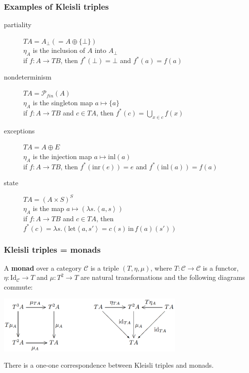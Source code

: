 \documentclass{beamer}
\newcommand{\inl}[1]{\text{inl}(#1)}
\newcommand{\inr}[1]{\text{inr}(#1)}
\begin{document}
\begin{frame}
  \frametitle{Examples of Kleisli triples}

  \begin{description}
  \item[partiality] $T A = A_\bot (= A \oplus \{ \bot \})$ \\
    $\eta_A$ is the inclusion of $A$ into $A_\bot$ \\
    if $f : A \to T B$, then $f^*(\bot) = \bot$ and $f^*(a) = f(a)$
  \vfill
  \pause
  \item[nondeterminism] $T A = \mathcal{P}_{fin}(A)$ \\
    $\eta_A$ is the singleton map $a \mapsto \{a\}$ \\
    if $f: A \to T B$ and $c \in T A$, then $f^*(c) = \bigcup_{x \in c} f(x)$
  \vfill
  \pause
  \item[exceptions] $T A = A \oplus E$ \\
    $\eta_A$ is the injection map $a \mapsto \inl{a}$ \\
    if $f : A \to T B$, then $f^*(\inr{e}) = e$ and $f^*(\inl{a}) = f(a)$
  \vfill
  \pause
  \item[state] $T A = (A \times S)^S$ \\
    $\eta_A$ is the map $a \mapsto (\lambda s. \left< a, s \right>)$ \\
    if $f : A \to T B$ and $c \in T A$, then $f^*(c) = \lambda s. (\text{let} \left<
    a, s' \right> = c(s) \, \text{in} \, f(a)(s'))$
  \end{description}
\end{frame}

\begin{frame}
  \frametitle{Kleisli triples = monads}

  A \textbf{monad} over a category $\mathcal{C}$ is a triple $(T, \eta, \mu)$,
  where $T : \mathcal{C} \to \mathcal{C}$ is a functor, $\eta :
  \text{Id}_{\mathcal{C}} \to T$ and $\mu : T^2 \to T$ are natural
  transformations and the following diagrams commute:

  \begin{center}
  \includegraphics[width=0.7\textwidth]{monad-diagrams.png}
  \end{center}

  \vfill
  \pause

  There is a one-one correspondence between Kleisli triples and monads.
\end{frame}
\end{document}

